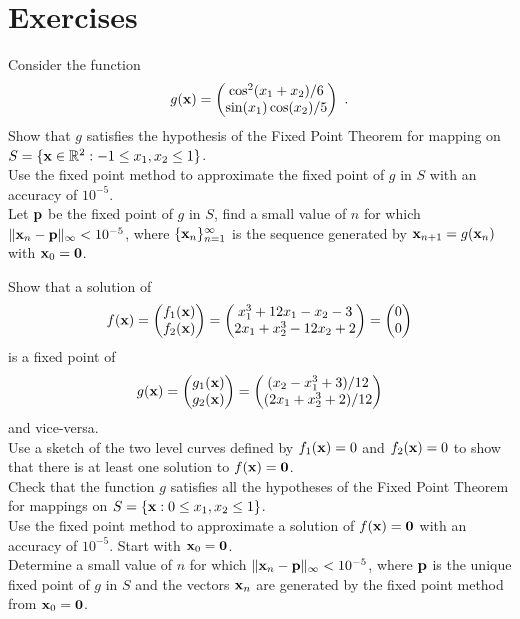 \section{Exercises}

\begin{question}
Consider the function
\[
g(\mathbf{x}) = \begin{pmatrix}
\cos^2(x_1+x_2)/6 \\
\sin(x_1)\cos(x_2)/5
\end{pmatrix} \ .
\]
 Show that $g$ satisfies the hypothesis of the Fixed Point
Theorem for mapping on
$S = \{ \mathbf{x} \in \mathbb{R}^2 : -1\leq x_1,x_2 \leq 1 \}$.\\
 Use the fixed point method to approximate
the fixed point of $g$ in $S$ with an accuracy of $10^{-5}$.\\
 Let $\mathbf{p}$ be the fixed point of $g$ in $S$, find a small value
of $n$ for which $\| \mathbf{x}_n - \mathbf{p}\|_\infty < 10^{-5}$, where
$\{\mathbf{x}_n\}_{n=1}^\infty$ is the sequence generated by
$\mathbf{x}_{n+1} = g(\mathbf{x}_n)$ with $\mathbf{x}_0 = \mathbf{0}$. 
\label{solvDQ1}
\end{question}

\begin{question}
 Show that a solution of
\[
f(\mathbf{x}) = \begin{pmatrix} f_1(\mathbf{x}) \\ f_2(\mathbf{x}) \end{pmatrix}
= \begin{pmatrix}
x_1^3 + 12x_1 - x_2 - 3 \\
2x_1 + x_2^3 - 12x_2 + 2
\end{pmatrix}
= \begin{pmatrix} 0 \\ 0 \end{pmatrix}
\]
is a fixed point of
\[
g(\mathbf{x}) = \begin{pmatrix} g_1(\mathbf{x}) \\ g_2(\mathbf{x}) \end{pmatrix}
= \begin{pmatrix}
(x_2 - x_1^3 + 3)/12 \\
(2x_1 + x_2^3 +2)/12
\end{pmatrix}
\]
and vice-versa.\\
 Use a sketch of the two level curves defined by $f_1(\mathbf{x})=0$
and $f_2(\mathbf{x}) =0$ to show that there is at least one solution to
$f(\mathbf{x}) = \mathbf{0}$.\\
 Check that the function $g$ satisfies all the hypotheses of
the Fixed Point Theorem for mappings on
$S =\left\{ \mathbf{x} : 0 \leq x_1, x_2 \leq 1 \right\}$.\\
 Use the fixed point method to approximate a
solution of $f(\mathbf{x}) = \mathbf{0}$ with an accuracy of $10^{-5}$.
Start with $\mathbf{x}_0 = \mathbf{0}$.\\
 Determine a small value of $n$ for which
$\| \mathbf{x}_n - \mathbf{p}\|_\infty < 10^{-5}$, where $\mathbf{p}$ is the
unique fixed point of $g$ in $S$ and the vectors $\mathbf{x}_n$ are
generated by the fixed point method from $\mathbf{x}_0 = \mathbf{0}$.
\label{solvDQ2}
\end{question}

